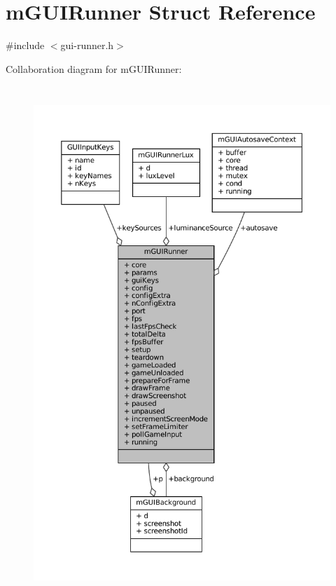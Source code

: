 \hypertarget{structm_g_u_i_runner}{}\section{m\+G\+U\+I\+Runner Struct Reference}
\label{structm_g_u_i_runner}


{\ttfamily \#include $<$gui-\/runner.\+h$>$}



Collaboration diagram for m\+G\+U\+I\+Runner\+:
\nopagebreak
\begin{figure}[H]
\begin{center}
\leavevmode
\includegraphics[height=550pt]{structm_g_u_i_runner__coll__graph}
\end{center}
\end{figure}
